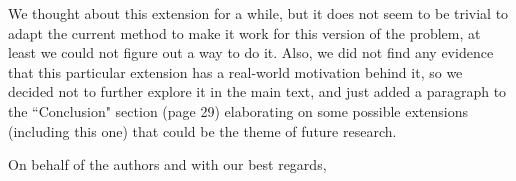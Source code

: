 \documentclass[letterpaper]{letter}
\begin{document}
\begin{letter}{}
		We thought about this extension for a while, but it does not seem to be trivial to adapt the current method to make it work for this version of the problem, at least we could not figure out a way to do it. Also, we did not find any evidence that this particular extension has a real-world motivation behind it, so we decided not to further explore it in the main text, and just added a paragraph to the ``Conclusion" section (page 29) elaborating on some possible extensions (including this one) that could be the theme of future research.
		
		
		\closing{On behalf of the authors and with our best regards,}
			\end{letter}
		
\end{document}
